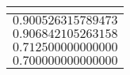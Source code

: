 %
\begin{table}[!tbp]
\begin{center}
\begin{tabular}{r}
\hline\hline
\multicolumn{1}{c}{}\tabularnewline
\hline
$0.900526315789473$\tabularnewline
$0.906842105263158$\tabularnewline
$0.712500000000000$\tabularnewline
$0.700000000000000$\tabularnewline
\hline
\end{tabular}
\end{center}
\end{table}

